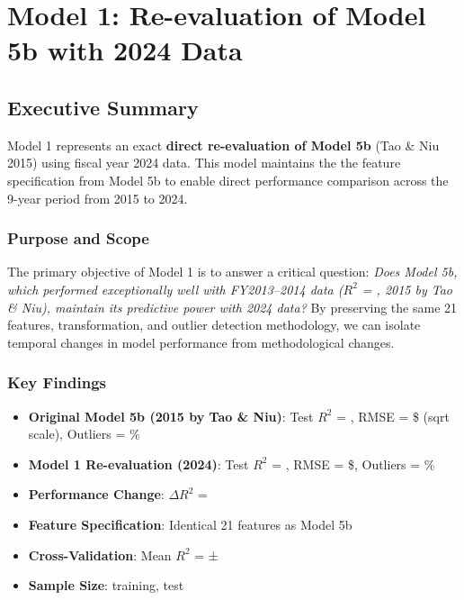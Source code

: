 \chapter{Model 1: Re-evaluation of Model 5b with 2024 Data}\label{ch:model1}



\def\themodel{1}

\section{Executive Summary}

Model 1 represents an exact \textbf{direct re-evaluation of Model 5b} (Tao \& Niu 2015) using fiscal year 2024 data. This model maintains the the feature specification from Model 5b to enable direct performance comparison across the 9-year period from 2015 to 2024.  

\subsection{Purpose and Scope}

The primary objective of Model 1 is to answer a critical question: \textit{Does Model 5b, which performed exceptionally well with FY2013--2014 data ($R^2$ = \ModelOneFiveBRSquaredTwoThousandFifteen, 2015 by Tao \& Niu), maintain its predictive power with 2024 data?} By preserving the same 21 features, transformation, and outlier detection methodology, we can isolate temporal changes in model performance from methodological changes.

\subsection{Key Findings}

\begin{itemize}
    \item \textbf{Original Model 5b (2015 by Tao \& Niu)}: Test $R^2$ = \ModelOneFiveBRSquaredTwoThousandFifteen, RMSE = \$\ModelOneFiveBRMSETwoThousandFifteen{} (sqrt scale), Outliers = \ModelOneFiveBOutlierPctTwoThousandFifteen\%
    \item \textbf{Model 1 Re-evaluation (2024)}: Test $R^2$ = \MRSquaredTest, RMSE = \$\MRMSETest, Outliers = \MOutlierPct\%
    \item \textbf{Performance Change}: $\Delta$$R^2$ = \ModelOneRSquaredDeltaFromTwoThousandFifteen
    \item \textbf{Feature Specification}: Identical 21 features as Model 5b
    \item \textbf{Cross-Validation}: Mean $R^2$ = \MCVMean{} ± \MCVStd
    \item \textbf{Sample Size}: \MTrainingSamples{} training, \MTestSamples{} test
\end{itemize}

